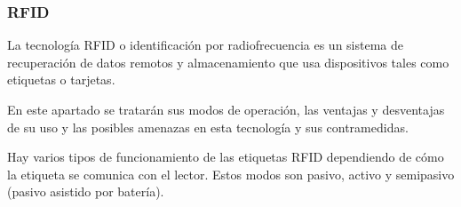 \documentclass[12pt,a4paper,onecolumn,oneside]{report}
\newcounter{subsubsubsection}[subsubsection]
\begin{document}
\subsubsection{RFID}

La tecnología RFID o identificación por radiofrecuencia es un sistema de recuperación de datos remotos y almacenamiento que usa dispositivos tales como etiquetas o tarjetas.

En este apartado se tratarán sus modos de operación, las ventajas y desventajas de su uso y las posibles amenazas en esta tecnología y sus contramedidas.


Hay varios tipos de funcionamiento de las etiquetas RFID dependiendo de cómo la etiqueta se comunica con el lector. Estos modos son pasivo, activo y semipasivo (pasivo asistido por batería).
\end{document}
